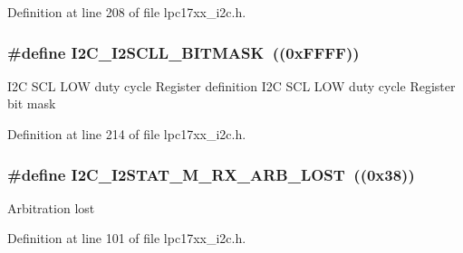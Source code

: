 \-Definition at line 208 of file lpc17xx\-\_\-i2c.\-h.

\hypertarget{group___i2_c___private___macros_gadf54076e458f10fc00be5ed9504bc930}{
\subsubsection[{\-I2\-C\-\_\-\-I2\-S\-C\-L\-L\-\_\-\-B\-I\-T\-M\-A\-S\-K}]{\setlength{\rightskip}{0pt plus 5cm}\#define {\bf \-I2\-C\-\_\-\-I2\-S\-C\-L\-L\-\_\-\-B\-I\-T\-M\-A\-S\-K}~((0x\-F\-F\-F\-F))}}\label{group___i2_c___private___macros_gadf54076e458f10fc00be5ed9504bc930}
\-I2\-C \-S\-C\-L \-L\-O\-W duty cycle \-Register definition \-I2\-C \-S\-C\-L \-L\-O\-W duty cycle \-Register bit mask 

\-Definition at line 214 of file lpc17xx\-\_\-i2c.\-h.

\hypertarget{group___i2_c___private___macros_gaed32dea40cf84a1efb09e0c389579163}{
\subsubsection[{\-I2\-C\-\_\-\-I2\-S\-T\-A\-T\-\_\-\-M\-\_\-\-R\-X\-\_\-\-A\-R\-B\-\_\-\-L\-O\-S\-T}]{\setlength{\rightskip}{0pt plus 5cm}\#define {\bf \-I2\-C\-\_\-\-I2\-S\-T\-A\-T\-\_\-\-M\-\_\-\-R\-X\-\_\-\-A\-R\-B\-\_\-\-L\-O\-S\-T}~((0x38))}}\label{group___i2_c___private___macros_gaed32dea40cf84a1efb09e0c389579163}
\-Arbitration lost 

\-Definition at line 101 of file lpc17xx\-\_\-i2c.\-h.


